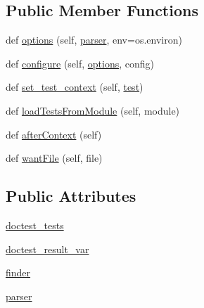 \subsection*{Public Member Functions}
\begin{DoxyCompactItemize}
\item 
def \hyperlink{classnumpy_1_1testing_1_1__private_1_1noseclasses_1_1NumpyDoctest_a7fc20d86ca5ba3a55211f8ce5d69f4a6}{options} (self, \hyperlink{classnumpy_1_1testing_1_1__private_1_1noseclasses_1_1NumpyDoctest_a6988d038f7e15856c744b8454ade8967}{parser}, env=os.\+environ)
\item 
def \hyperlink{classnumpy_1_1testing_1_1__private_1_1noseclasses_1_1NumpyDoctest_a7b768d10d3af53dc6baf84e747c7c357}{configure} (self, \hyperlink{classnumpy_1_1testing_1_1__private_1_1noseclasses_1_1NumpyDoctest_a7fc20d86ca5ba3a55211f8ce5d69f4a6}{options}, config)
\item 
def \hyperlink{classnumpy_1_1testing_1_1__private_1_1noseclasses_1_1NumpyDoctest_a234f8dc406c9716b5cbba35a4207731e}{set\+\_\+test\+\_\+context} (self, \hyperlink{namespacenumpy_1_1testing_a6e95cdd7f4d6021fbb8519b9f868c27b}{test})
\item 
def \hyperlink{classnumpy_1_1testing_1_1__private_1_1noseclasses_1_1NumpyDoctest_ae9543aa27a71677d47c81ec7ebbc4654}{load\+Tests\+From\+Module} (self, module)
\item 
def \hyperlink{classnumpy_1_1testing_1_1__private_1_1noseclasses_1_1NumpyDoctest_abbc6ccf49aa0f96ed6a1846f24e46169}{after\+Context} (self)
\item 
def \hyperlink{classnumpy_1_1testing_1_1__private_1_1noseclasses_1_1NumpyDoctest_a9671dd3e3a7abc756ab4394c907db099}{want\+File} (self, file)
\end{DoxyCompactItemize}
\subsection*{Public Attributes}
\begin{DoxyCompactItemize}
\item 
\hyperlink{classnumpy_1_1testing_1_1__private_1_1noseclasses_1_1NumpyDoctest_a9d8d20fb0a1c802ea091251dca13ed54}{doctest\+\_\+tests}
\item 
\hyperlink{classnumpy_1_1testing_1_1__private_1_1noseclasses_1_1NumpyDoctest_a8f4cec29a2d7dff9b04ac5afebb6e23b}{doctest\+\_\+result\+\_\+var}
\item 
\hyperlink{classnumpy_1_1testing_1_1__private_1_1noseclasses_1_1NumpyDoctest_a8960d0e2fcef303a87d4d7624542f0ad}{finder}
\item 
\hyperlink{classnumpy_1_1testing_1_1__private_1_1noseclasses_1_1NumpyDoctest_a6988d038f7e15856c744b8454ade8967}{parser}
\end{DoxyCompactItemize}
